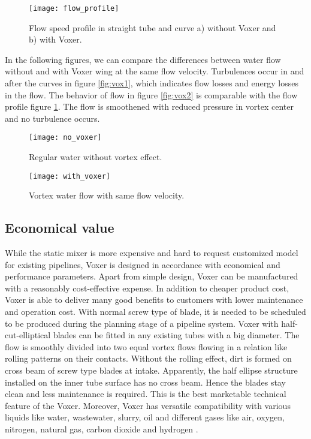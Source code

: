 \begin{figure}[h!]
  \centering
  \texttt{[image: flow\_profile]}
  \caption{ Flow speed profile in straight tube and curve \newline a) without Voxer and b) with Voxer. \cite{voxer:article}}
  \label{fig:flowprofile}
\end{figure}

In the following figures, we can compare the differences between water flow without and with Voxer wing at the same flow velocity. Turbulences occur in and after the curves in figure \vref{fig:vox1}, which indicates flow losses and energy losses in the flow. The behavior of flow in figure \vref{fig:vox2} is comparable with the flow profile figure \ref{fig:flowprofile}. The flow is smoothened with reduced pressure in vortex center and no turbulence occurs.

\begin{figure}[h]
  \centering
  \texttt{[image: no\_voxer]}
  \caption{ Regular water without vortex effect.\cite{voxer:article}}
  \label{fig:vox1}
\end{figure}

\begin{figure}[h]
  \centering
  \texttt{[image: with\_voxer]}
  \caption{ Vortex water flow with same flow velocity.\cite{voxer:article}}
  \label{fig:vox2}
\end{figure}

\subsection{Economical value}
While the static mixer is more expensive and hard to request customized model for existing pipelines, Voxer is designed in accordance with economical and performance parameters. Apart from simple design, Voxer can be manufactured with a reasonably cost-effective expense. In addition to cheaper product cost, Voxer is able to deliver many good benefits to customers with lower maintenance and operation cost.
With normal screw type of blade, it is needed to be scheduled to be produced during the planning stage of a pipeline system. Voxer with half-cut-elliptical blades can be fitted in any existing tubes with a big diameter. The flow is smoothly divided into two equal vortex flows flowing in a relation like rolling patterns on their contacts. Without the rolling effect, dirt is formed on cross beam of screw type blades at intake. Apparently, the half ellipse structure installed on the inner tube surface has no cross beam. Hence the blades stay clean and less maintenance is required. This is the best marketable technical feature of the Voxer. Moreover, Voxer has versatile compatibility with various liquids like water, wastewater, slurry, oil and different gases like air, oxygen, nitrogen, natural gas, carbon dioxide and hydrogen \cite{voxer:article}. 

